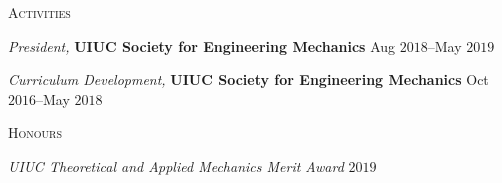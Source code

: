 \documentclass[10pt]{article}
\begin{document}
\begin{multicols}{2}
\textsc{Activities}
\columnbreak

\textit{President,} \textbf{UIUC Society for Engineering Mechanics} \hfill Aug $2018$--May $2019$

\vspace{-0.75em}

%
\textit{Curriculum Development,} \textbf{UIUC Society for Engineering Mechanics} \hfill Oct $2016$--May $2018$

%
\end{multicols}
\vspace{-1.5em} 
\begin{multicols}{2}
\textsc{Honours}
\columnbreak

\textit{UIUC Theoretical and Applied Mechanics Merit Award} \hfill $2019$

%
\end{multicols}
\end{document}

